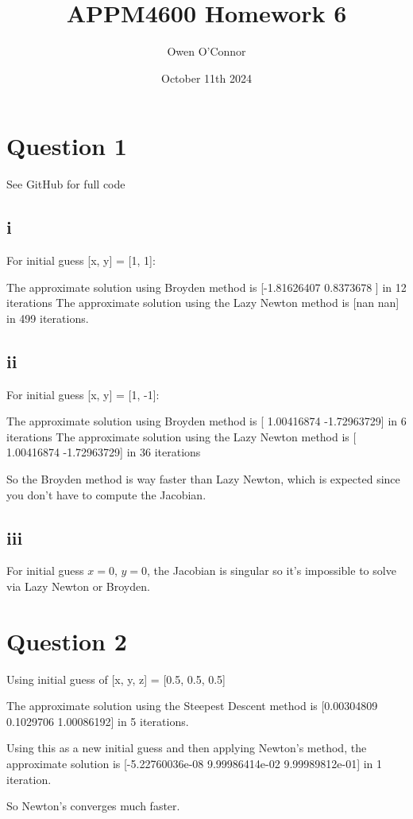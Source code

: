 \documentclass{article}
\title{APPM4600 Homework 6}
\author{Owen O'Connor}
\date{October 11th 2024}
\begin{document}
\maketitle

\section{Question 1}
See GitHub for full code
\subsection{i}
For initial guess [x, y] = [1, 1]:

The approximate solution using Broyden method is [-1.81626407  0.8373678 ] in 12 iterations
The approximate solution using the Lazy Newton method is [nan nan] in 499 iterations.

\subsection{ii}
For initial guess [x, y] = [1, -1]:

The approximate solution using Broyden method is [ 1.00416874 -1.72963729] in 6 iterations
The approximate solution using the Lazy Newton method is [ 1.00416874 -1.72963729] in 36 iterations

So the Broyden method is way faster than Lazy Newton, which is expected since you don't have to compute the Jacobian.
\subsection{iii}
For initial guess $x = 0$, $y = 0$, the Jacobian is singular so it's impossible to solve via Lazy Newton or Broyden.

\section{Question 2}
Using initial guess of [x, y, z] = [0.5, 0.5, 0.5] 

The approximate solution using the Steepest Descent method is [0.00304809 0.1029706  1.00086192] in 5 iterations.

Using this as a new initial guess and then applying Newton's method, the approximate solution is [-5.22760036e-08  9.99986414e-02  9.99989812e-01] in 1 iteration.

So Newton's converges much faster.
\end{document}
